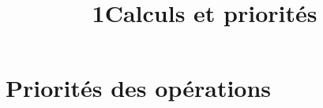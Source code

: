 \documentclass[12pt,a4paper]{article}
\date{}
\title{\textcircled{{\normalsize{1}}}Calculs et priorités}
\begin{document}
\maketitle





\section{Priorités des opérations}

%
%
%	
%		
%		
%		
%	
%		
\end{document}

